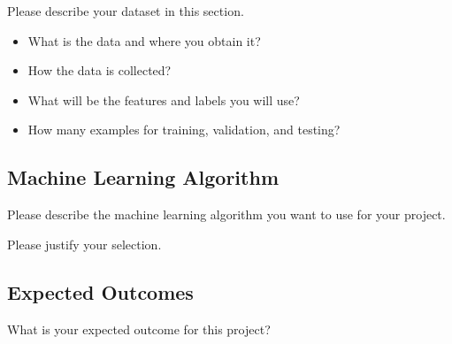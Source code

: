 \documentclass[11pt]{article}
\begin{document}
Please describe your dataset in this section.

\begin{itemize}
  \item What is the data and where you obtain it?
  \item How the data is collected?
  \item What will be the features and labels you will use?
  \item How many examples for training, validation, and testing?
\end{itemize}

\subsection{Machine Learning Algorithm}

Please describe the machine learning algorithm you want to use
for your project.

\noindent Please justify your selection.

\subsection{Expected Outcomes}

What is your expected outcome for this project?
\end{document}
